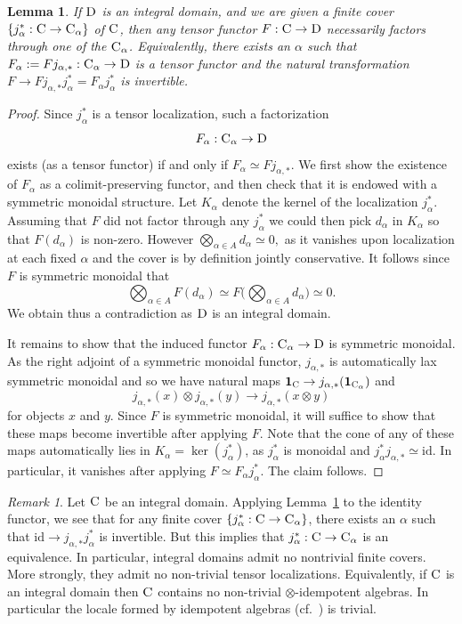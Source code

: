 \documentclass[12pt, oneside]{amsart}
\numberwithin{equation}{section}
\newtheorem{lemma}[subsubsection]{Lemma}
\theoremstyle{remark}
\newtheorem{remark}[subsubsection]{Remark}
\theoremstyle{plain}
\newcommand{\CC}{\textsc{C}}
\newcommand{\DD}{\textsc{D}}
\newcommand{\id}{\mathrm{id}}
\begin{document}
\begin{lemma}\label{local} If $\DD$ is an integral domain, and we are given a finite cover $\{j^{*}_{\alpha}:\CC\rightarrow \CC_{\alpha}\}$ of $\CC$, then any tensor functor $F : \CC \to \DD$ necessarily factors through one of the $\CC_{\alpha}$. Equivalently, there exists an $\alpha$ such that $F_\alpha := F j_{\alpha,*} : \CC_\alpha \to \DD$ is a tensor functor and the natural transformation $F \to F j_{\alpha,*}j_{\alpha}^* =F_\alpha j_{\alpha}^*$ is invertible. \end{lemma}
\begin{proof} Since $j_\alpha^*$ is a tensor localization, such a factorization $$F_\alpha : \CC_\alpha \to \DD$$ exists (as a tensor functor) if and only if $F_{\alpha} \simeq F j_{\alpha,*}$. We first show the existence of $F_\alpha$ as a colimit-preserving functor, and then check that it is endowed with a symmetric monoidal structure. Let $K_{\alpha}$ denote the kernel of the localization $j_{\alpha}^*$. Assuming that $F$ did not factor through any $j_{\alpha}^*$ we could then pick $d_{\alpha}$ in $K_{\alpha}$ so that $F(d_{\alpha})$ is non-zero. However $\bigotimes_{\alpha\in A}d_{\alpha}\simeq 0,$ as it vanishes upon localization at each fixed $\alpha$ and the cover is by definition jointly conservative. It follows since $F$ is symmetric monoidal that $$\bigotimes_{\alpha\in A}F(d_{\alpha}) \simeq F\bigl(\bigotimes_{\alpha\in A}d_{\alpha}\bigr) \simeq 0.$$  We obtain thus a contradiction as $\DD$ is an integral domain.

It remains to show that the induced functor $F_{\alpha} : \CC_{\alpha}\rightarrow \DD$ is symmetric monoidal. As the right adjoint of a symmetric monoidal functor, $j_{\alpha,*}$ is automatically lax symmetric monoidal and so we have natural maps $\mathbf{1}_{\CC} \to j_{\alpha,*}(\mathbf{1}_{\CC_\alpha})$ and $$j_{\alpha,*}(x)\otimes j_{\alpha,*}(y)\rightarrow j_{\alpha,*}(x\otimes y)$$ for objects $x$ and $y$. Since $F$ is symmetric monoidal, it will suffice to show that these maps become invertible after applying $F$.  Note that the cone of any of these maps automatically lies in $K_{\alpha}=\operatorname{ker}(j_{\alpha}^{*})$, as $j_{\alpha}^{*}$ is monoidal and $j_{\alpha}^{*}j_{\alpha,*}\simeq\id$. In particular, it vanishes after applying $F \simeq F_\alpha j_\alpha^*$. The claim follows. \end{proof}

\begin{remark} Let $\CC$ be an integral domain. Applying Lemma~\ref{local} to the identity functor, we see that for any finite cover $\{j^{*}_{\alpha}: \CC \rightarrow \CC_{\alpha}\}$, there exists an $\alpha$ such that $\id \to j_{\alpha,*}j_\alpha^*$ is invertible. But this implies that $j_\alpha^* : \CC \to \CC_\alpha$ is an equivalence. In particular, integral domains admit no nontrivial finite covers. More strongly, they admit no non-trivial tensor localizations. Equivalently, if $\CC$ is an integral domain then $\CC$ contains no non-trivial $\otimes$-idempotent algebras. In particular the locale formed by idempotent algebras (cf.~\cite{BKS}) is trivial. \end{remark}
\end{document}
